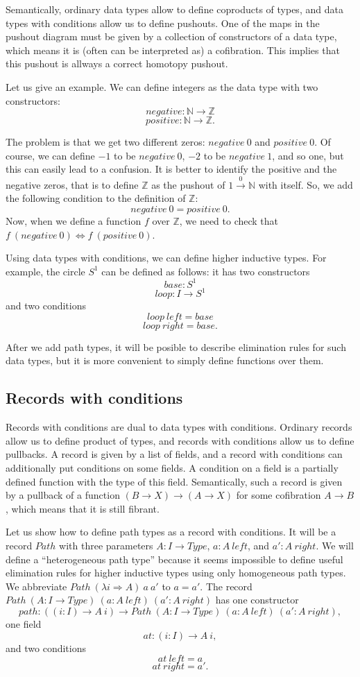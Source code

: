 \documentclass{amsart}
\theoremstyle{definition}
\theoremstyle{remark}
\newcommand{\red}{\Rightarrow}
\newcommand{\deq}{\Leftrightarrow}
\numberwithin{figure}{section}
\begin{document}
Semantically, ordinary data types allow to define coproducts of types, and data types with conditions allow us to define pushouts.
One of the maps in the pushout diagram must be given by a collection of constructors of a data type, which means it is (often can be interpreted as) a cofibration.
This implies that this pushout is allways a correct homotopy pushout.

Let us give an example. We can define integers as the data type with two constructors:
\[ negative : \mathbb{N} \to \mathbb{Z} \]
\[ positive : \mathbb{N} \to \mathbb{Z}. \]

The problem is that we get two different zeros: $negative\ 0$ and $positive\ 0$.
Of course, we can define $-1$ to be $negative\ 0$, $-2$ to be $negative\ 1$, and so one, but this can easily lead to a confusion.
It is better to identify the positive and the negative zeros, that is to define $\mathbb{Z}$ as the pushout of $1 \overset{0}\to \mathbb{N}$ with itself.
So, we add the following condition to the definition of $\mathbb{Z}$:
\[ negative\ 0 = positive\ 0. \]
Now, when we define a function $f$ over $\mathbb{Z}$, we need to check that $f\ (negative\ 0) \deq f\ (positive\ 0)$.

Using data types with conditions, we can define higher inductive types.
For example, the circle $S^1$ can be defined as follows: it has two constructors
\[ base : S^1 \]
\[ loop : I \to S^1 \]
and two conditions
\[ loop\ left = base \]
\[ loop\ right = base. \]

After we add path types, it will be posible to describe elimination rules for such data types,
but it is more convenient to simply define functions over them.

\subsection{Records with conditions}

Records with conditions are dual to data types with conditions.
Ordinary records allow us to define product of types, and records with conditions allow us to define pullbacks.
A record is given by a list of fields, and a record with conditions can additionally put conditions on some fields.
A condition on a field is a partially defined function with the type of this field.
Semantically, such a record is given by a pullback of a function $(B \to X) \to (A \to X)$ for some cofibration $A \to B$, which means that it is still fibrant.

Let us show how to define path types as a record with conditions.
It will be a record $Path$ with three parameters $A : I \to Type$, $a : A\ left$, and $a' : A\ right$.
We will define a ``heterogeneous path type'' because it seems impossible to define useful elimination rules for higher inductive types using only homogeneous path types.
We abbreviate $Path\ (\lambda i \red A)\ a\ a'$ to $a = a'$.
The record $Path\ (A : I \to Type)\ (a : A\ left)\ (a' : A\ right)$ has one constructor
\[ path : ((i : I) \to A\ i) \to Path\ (A : I \to Type)\ (a : A\ left)\ (a' : A\ right), \]
one field
\[ at : (i : I) \to A\ i, \]
and two conditions
\[ at\ left = a \]
\[ at\ right = a'. \]
\end{document}
